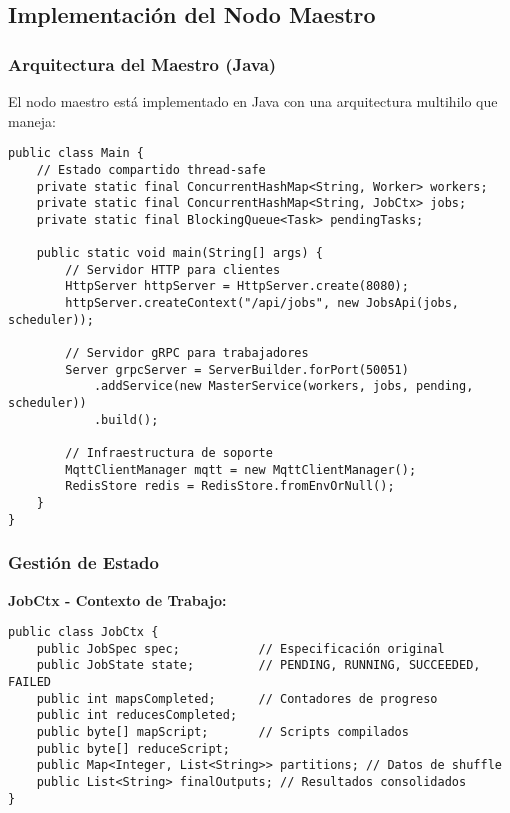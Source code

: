 \subsection{Implementación del Nodo Maestro}

\subsubsection{Arquitectura del Maestro (Java)}

El nodo maestro está implementado en Java con una arquitectura multihilo que maneja:

\begin{verbatim}
public class Main {
    // Estado compartido thread-safe
    private static final ConcurrentHashMap<String, Worker> workers;
    private static final ConcurrentHashMap<String, JobCtx> jobs;
    private static final BlockingQueue<Task> pendingTasks;
    
    public static void main(String[] args) {
        // Servidor HTTP para clientes
        HttpServer httpServer = HttpServer.create(8080);
        httpServer.createContext("/api/jobs", new JobsApi(jobs, scheduler));
        
        // Servidor gRPC para trabajadores
        Server grpcServer = ServerBuilder.forPort(50051)
            .addService(new MasterService(workers, jobs, pending, scheduler))
            .build();
        
        // Infraestructura de soporte
        MqttClientManager mqtt = new MqttClientManager();
        RedisStore redis = RedisStore.fromEnvOrNull();
    }
}
\end{verbatim}

\subsubsection{Gestión de Estado}

\textbf{JobCtx - Contexto de Trabajo:}
\begin{verbatim}
public class JobCtx {
    public JobSpec spec;           // Especificación original
    public JobState state;         // PENDING, RUNNING, SUCCEEDED, FAILED
    public int mapsCompleted;      // Contadores de progreso
    public int reducesCompleted;
    public byte[] mapScript;       // Scripts compilados
    public byte[] reduceScript;
    public Map<Integer, List<String>> partitions; // Datos de shuffle
    public List<String> finalOutputs; // Resultados consolidados
}
\end{verbatim}

